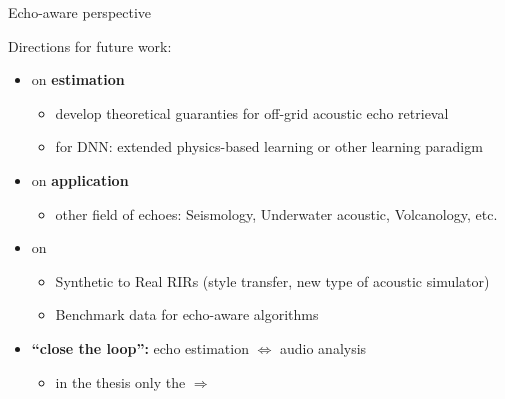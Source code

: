 \begin{frame}{Echo-aware perspective}

    Directions for future work:
    \begin{itemize}
        \item[\mytriag] on \textbf{estimation}
        \begin{itemize}\small
            \item develop theoretical guaranties for off-grid acoustic echo retrieval
            \item for DNN: extended physics-based learning or other learning paradigm
        \end{itemize}

        \vfill
        \item[\mytriag] on \textbf{application}
        \begin{itemize}
            \item other field of echoes: Seismology, Underwater acoustic, Volcanology, etc.
        \end{itemize}

        \vfill
        \item[\mytriag] on \dechorate
        \begin{itemize}
            \item Synthetic to Real RIRs (style transfer, new type of acoustic simulator)
            \item Benchmark data for echo-aware algorithms
        \end{itemize}

        \vfill
        \item[\mytriag] \textbf{``close the loop'':}  echo estimation $\Leftrightarrow$ audio analysis
        \begin{itemize}
            \item in the thesis only the $\Rightarrow$
        \end{itemize}
    \end{itemize}

\end{frame}



